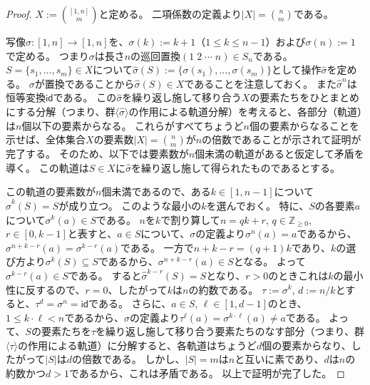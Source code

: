 ﻿\documentclass{ltjsarticle}
\theoremstyle{definition}
\begin{document}
\begin{proof}
    $X := \binom{[1,n]}{m}$と定める。
    二項係数の定義より$|X| = \binom{n}{m}$である。

    写像$\sigma \colon [1,n] \to [1,n]$を、$\sigma(k) := k+1$（$1 \leq k \leq n-1$）および$\sigma(n) := 1$で定める。
    つまり$\sigma$は長さ$n$の巡回置換$(1\;2\;\cdots\;n) \in S_n$である。
    $S = \{s_1,\dots,s_m\} \in X$について$\widehat{\sigma}(S) := \{ \sigma(s_1),\dots,\sigma(s_m) \}$として操作$\widehat{\sigma}$を定める。
    $\sigma$が置換であることから$\widehat{\sigma}(S) \in X$であることを注意しておく。
    また$\widehat{\sigma}^n$は恒等変換$\mathsf{id}$である。
    この$\widehat{\sigma}$を繰り返し施して移り合う$X$の要素たちをひとまとめにする分解（つまり、群$\langle \widehat{\sigma} \rangle$の作用による軌道分解）を考えると、各部分（軌道）は$n$個以下の要素からなる。
    これらがすべてちょうど$n$個の要素からなることを示せば、全体集合$X$の要素数$|X| = \binom{n}{m}$が$n$の倍数であることが示されて証明が完了する。
    そのため、以下では要素数が$n$個未満の軌道があると仮定して矛盾を導く。
    この軌道は$S \in X$に$\widehat{\sigma}$を繰り返し施して得られたものであるとする。

    この軌道の要素数が$n$個未満であるので、ある$k \in [1,n-1]$について$\widehat{\sigma}^k(S) = S$が成り立つ。
    このような最小の$k$を選んでおく。
    特に、$S$の各要素$a$について$\sigma^k(a) \in S$である。
    $n$を$k$で割り算して$n = qk + r$, $q \in \mathbb{Z}_{\geq 0}$, $r \in [0,k-1]$と表すと、$a \in S$について、$\sigma$の定義より$\sigma^n(a) = a$であるから、$\sigma^{n+k-r}(a) = \sigma^{k-r}(a)$である。
    一方で$n + k - r = (q+1)k$であり、$k$の選び方より$\sigma^k(S) \subseteq S$であるから、$\sigma^{n+k-r}(a) \in S$となる。
    よって$\sigma^{k-r}(a) \in S$である。
    すると$\widehat{\sigma}^{k-r}(S) = S$となり、$r > 0$のときこれは$k$の最小性に反するので、$r = 0$、したがって$k$は$n$の約数である。
    $\tau := \sigma^k$, $d := n/k$とすると、$\tau^d = \sigma^n = \mathsf{id}$である。
    さらに、$a \in S$, $\ell \in [1,d-1]$のとき、$1 \leq k \cdot \ell < n$であるから、$\sigma$の定義より$\tau^{\ell}(a) = \sigma^{k \cdot \ell}(a) \neq a$である。
    よって、$S$の要素たちを$\tau$を繰り返し施して移り合う要素たちのなす部分（つまり、群$\langle \tau \rangle$の作用による軌道）に分解すると、各軌道はちょうど$d$個の要素からなり、したがって$|S|$は$d$の倍数である。
    しかし、$|S| = m$は$n$と互いに素であり、$d$は$n$の約数かつ$d > 1$であるから、これは矛盾である。
    以上で証明が完了した。
\end{proof}
\end{document}
